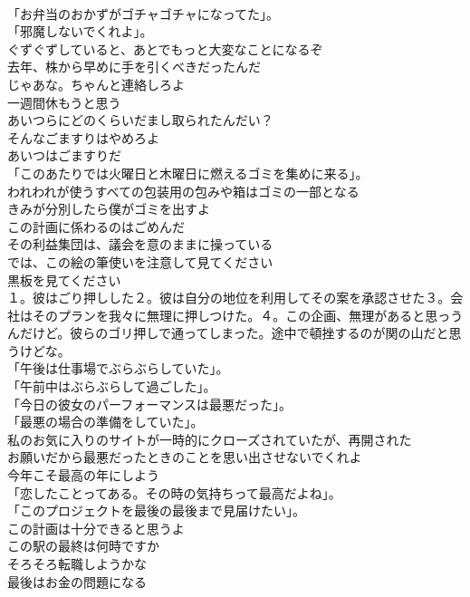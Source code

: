 \documentclass[8pt]{extreport}
\begin{document}
\begin{CJK}{UTF8}{min}
\\	「お弁当のおかずがゴチャゴチャになってた」。	
\\	「邪魔しないでくれよ」。	
\\	ぐずぐずしていると、あとでもっと大変なことになるぞ	
\\	去年、株から早めに手を引くべきだったんだ	
\\	じゃあな。ちゃんと連絡しろよ	
\\	一週間休もうと思う	
\\	あいつらにどのくらいだまし取られたんだい？	
\\	そんなごますりはやめろよ	
\\	あいつはごますりだ	
\\	「このあたりでは火曜日と木曜日に燃えるゴミを集めに来る」。	
\\	われわれが使うすべての包装用の包みや箱はゴミの一部となる	
\\	きみが分別したら僕がゴミを出すよ	
\\	この計画に係わるのはごめんだ	
\\	その利益集団は、議会を意のままに操っている	
\\	では、この絵の筆使いを注意して見てください	
\\	黒板を見てください	
\\	１。彼はごり押しした２。彼は自分の地位を利用してその案を承認させた３。会社はそのプランを我々に無理に押しつけた。４。この企画、無理があると思っうんだけど。彼らのゴリ押しで通ってしまった。途中で頓挫するのが関の山だと思うけどな。	
\\	「午後は仕事場でぶらぶらしていた」。	
\\	「午前中はぶらぶらして過ごした」。	
\\	「今日の彼女のパーフォーマンスは最悪だった」。	
\\	「最悪の場合の準備をしていた」。	
\\	私のお気に入りのサイトが一時的にクローズされていたが、再開された	
\\	お願いだから最悪だったときのことを思い出させないでくれよ	
\\	今年こそ最高の年にしよう	
\\	「恋したことってある。その時の気持ちって最高だよね」。	
\\	「このプロジェクトを最後の最後まで見届けたい」。	
\\	この計画は十分できると思うよ	
\\	この駅の最終は何時ですか	
\\	そろそろ転職しようかな	
\\	最後はお金の問題になる	

\end{CJK}
\end{document}
